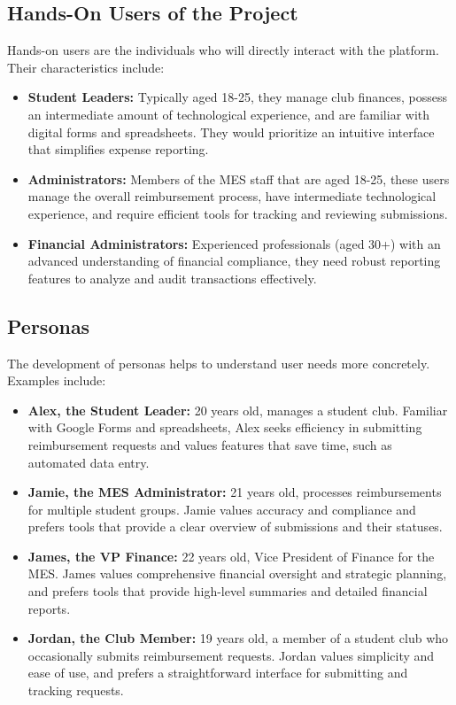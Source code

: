 \documentclass[12pt]{article}
\begin{document}
\subsection{Hands-On Users of the Project}
Hands-on users are the individuals who will directly interact with the platform. Their characteristics include:
\begin{itemize}
    \item \textbf{Student Leaders:} Typically aged 18-25, they manage club finances, possess an intermediate amount of technological experience, and are familiar with digital forms and spreadsheets. They would prioritize an intuitive interface that simplifies expense reporting.
    \item \textbf{Administrators:} Members of the MES staff that are aged 18-25, these users manage the overall reimbursement process, have intermediate technological experience, and require efficient tools for tracking and reviewing submissions.
    \item \textbf{Financial Administrators:} Experienced professionals (aged 30+) with an advanced understanding of financial compliance, they need robust reporting features to analyze and audit transactions effectively.
\end{itemize}

\subsection{Personas}
The development of personas helps to understand user needs more concretely. Examples include:
\begin{itemize}
  \item \textbf{Alex, the Student Leader:} 20 years old, manages a student club. Familiar with Google Forms and spreadsheets, Alex seeks efficiency in submitting reimbursement requests and values features that save time, such as automated data entry.
  \item \textbf{Jamie, the MES Administrator:} 21 years old, processes reimbursements for multiple student groups. Jamie values accuracy and compliance and prefers tools that provide a clear overview of submissions and their statuses.
  \item \textbf{James, the VP Finance:} 22 years old, Vice President of Finance for the MES. James values comprehensive financial oversight and strategic planning, and prefers tools that provide high-level summaries and detailed financial reports.
  \item \textbf{Jordan, the Club Member:} 19 years old, a member of a student club who occasionally submits reimbursement requests. Jordan values simplicity and ease of use, and prefers a straightforward interface for submitting and tracking requests.
\end{itemize}
\end{document}
